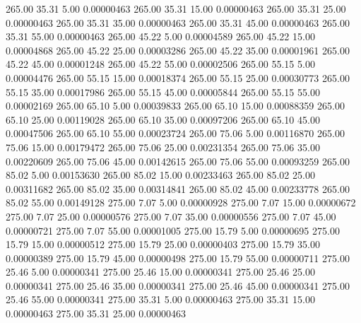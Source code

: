     265.00     35.31      5.00     0.00000463
    265.00     35.31     15.00     0.00000463
    265.00     35.31     25.00     0.00000463
    265.00     35.31     35.00     0.00000463
    265.00     35.31     45.00     0.00000463
    265.00     35.31     55.00     0.00000463
    265.00     45.22      5.00     0.00004589
    265.00     45.22     15.00     0.00004868
    265.00     45.22     25.00     0.00003286
    265.00     45.22     35.00     0.00001961
    265.00     45.22     45.00     0.00001248
    265.00     45.22     55.00     0.00002506
    265.00     55.15      5.00     0.00004476
    265.00     55.15     15.00     0.00018374
    265.00     55.15     25.00     0.00030773
    265.00     55.15     35.00     0.00017986
    265.00     55.15     45.00     0.00005844
    265.00     55.15     55.00     0.00002169
    265.00     65.10      5.00     0.00039833
    265.00     65.10     15.00     0.00088359
    265.00     65.10     25.00     0.00119028
    265.00     65.10     35.00     0.00097206
    265.00     65.10     45.00     0.00047506
    265.00     65.10     55.00     0.00023724
    265.00     75.06      5.00     0.00116870
    265.00     75.06     15.00     0.00179472
    265.00     75.06     25.00     0.00231354
    265.00     75.06     35.00     0.00220609
    265.00     75.06     45.00     0.00142615
    265.00     75.06     55.00     0.00093259
    265.00     85.02      5.00     0.00153630
    265.00     85.02     15.00     0.00233463
    265.00     85.02     25.00     0.00311682
    265.00     85.02     35.00     0.00314841
    265.00     85.02     45.00     0.00233778
    265.00     85.02     55.00     0.00149128
    275.00      7.07      5.00     0.00000928
    275.00      7.07     15.00     0.00000672
    275.00      7.07     25.00     0.00000576
    275.00      7.07     35.00     0.00000556
    275.00      7.07     45.00     0.00000721
    275.00      7.07     55.00     0.00001005
    275.00     15.79      5.00     0.00000695
    275.00     15.79     15.00     0.00000512
    275.00     15.79     25.00     0.00000403
    275.00     15.79     35.00     0.00000389
    275.00     15.79     45.00     0.00000498
    275.00     15.79     55.00     0.00000711
    275.00     25.46      5.00     0.00000341
    275.00     25.46     15.00     0.00000341
    275.00     25.46     25.00     0.00000341
    275.00     25.46     35.00     0.00000341
    275.00     25.46     45.00     0.00000341
    275.00     25.46     55.00     0.00000341
    275.00     35.31      5.00     0.00000463
    275.00     35.31     15.00     0.00000463
    275.00     35.31     25.00     0.00000463
